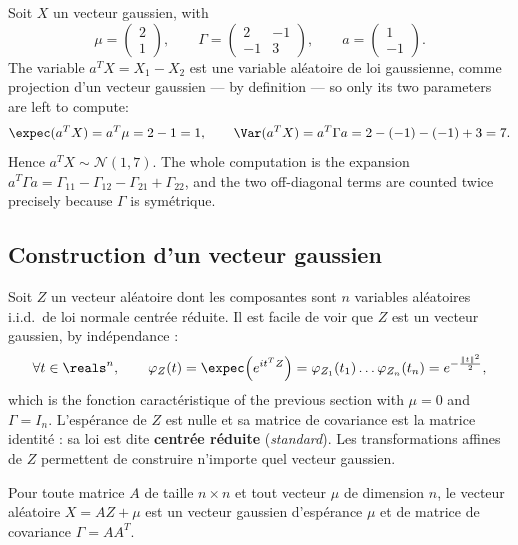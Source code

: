 \begin{example}
Soit $X$ un vecteur gaussien, with
\[
  \mu = \begin{pmatrix} 2 \\ 1 \end{pmatrix}, \qquad
  \Gamma = \begin{pmatrix} 2 & -1 \\ -1 & 3 \end{pmatrix}, \qquad
  a = \begin{pmatrix} 1 \\ -1 \end{pmatrix} .
\]
The variable $a^{T}X = X_{1} - X_{2}$ est une variable aléatoire de loi
gaussienne, comme projection d'un vecteur gaussien --- by definition --- so only
its two parameters are left to compute:
\[
  \expec(a^{T}X) = a^{T}\mu = 2 - 1 = 1, \qquad
  \Var(a^{T}X) = a^{T}\Gamma a = 2 - (-1) - (-1) + 3 = 7 .
\]
Hence $a^{T}X \sim \mathcal{N}(1,7)$. The whole computation is the expansion
$a^{T}\Gamma a = \Gamma_{11} - \Gamma_{12} - \Gamma_{21} + \Gamma_{22}$, and the
two off-diagonal terms are counted twice precisely because $\Gamma$ is symétrique.
\end{example}

\subsection{Construction d'un vecteur gaussien}

Soit $Z$ un vecteur aléatoire dont les composantes sont $n$ variables aléatoires
i.i.d.\ de loi normale centrée réduite. Il est facile de voir que $Z$ est un
vecteur gaussien, by indépendance :
\[
  \forall t \in \reals^{n}, \qquad
  \varphi_{Z}(t) = \expec\!\left(e^{it^{T}Z}\right)
                 = \varphi_{Z_{1}}(t_{1}) \dots \varphi_{Z_{n}}(t_{n})
                 = e^{-\frac{\|t\|^{2}}{2}} ,
\]
which is the fonction caractéristique of the previous section with $\mu = 0$ and
$\Gamma = I_{n}$. L'espérance de $Z$ est nulle et sa matrice de covariance est la
matrice identité : sa loi est dite \textbf{centrée réduite}
(\textit{standard}).
Les transformations affines de $Z$ permettent de construire n'importe quel
vecteur gaussien.

\begin{prop}
Pour toute matrice $A$ de taille $n \times n$ et tout vecteur $\mu$ de dimension
$n$, le vecteur aléatoire $X = AZ + \mu$ est un vecteur gaussien d'espérance
$\mu$ et de matrice de covariance $\Gamma = AA^{T}$.
\end{prop}

